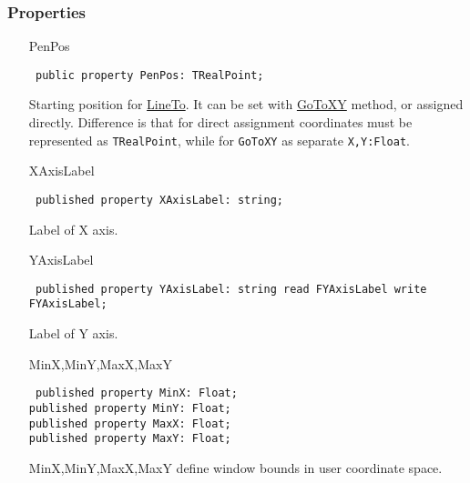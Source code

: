 \documentclass[12pt,a4paper,oneside]{report}
\newcommand{\declarationitem}[1]{{\addfontfeatures{FakeBold=1.3} #1}}
\newcommand{\code}[1]{\texttt{#1}}
\begin{document}
\subsubsection{Properties}
\begin{itemize}\label{lmcoordsys.TCoordSys-PenPos}
\item[\declarationitem{PenPos}\hfill]
\begin{flushleft}
\code{
public property PenPos: TRealPoint;}
\end{flushleft}

Starting position for \hyperref[sec:lineto]{LineTo}. It can be set with \hyperref[lmcoordsys.TCoordSys-GoToXY]{GoToXY} method, or assigned directly. Difference is that for direct assignment coordinates must be represented as \code{TRealPoint}, while for \code{GoToXY} as separate \code{X,Y:Float}. \label{lmcoordsys.TCoordSys-XAxisLabel}
\item[\declarationitem{XAxisLabel}\hfill]
\begin{flushleft}
\code{
published property XAxisLabel: string;}\label{lmcoordsys.TCoordSys-YAxisLabel}
\end{flushleft}

Label of X axis.
\item[\declarationitem{YAxisLabel}\hfill]
\begin{flushleft}
\code{
published property YAxisLabel: string read FYAxisLabel write FYAxisLabel;}
\end{flushleft}
\par Label of Y axis.  
\item[\declarationitem{MinX,MinY,MaxX,MaxY}\hfill]
\begin{flushleft}
\code{
published property MinX: Float;\\
published property MinY: Float;\\
published property MaxX: Float;\\
published property MaxY: Float;
}
\end{flushleft}
\label{lmcoordsys.TCoordSys-MinX}
 MinX,MinY,MaxX,MaxY define window bounds in user coordinate space.\label{lmcoordsys.TCoordSys-MinY}
\label{lmcoordsys.TCoordSys-XPos}


\end{itemize}
\end{document}
